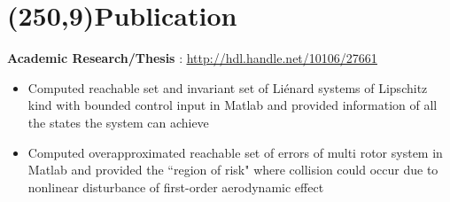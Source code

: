 \documentclass[10pt,a4paper]{extarticle}
\begin{document}
\section*{\colorbox{gray!10}{\makebox(250,9){\textcolor{blue!65}{Publication\hfill}}}}
\textbf{Academic Research/Thesis} : \href{http://hdl.handle.net/10106/27661}{\ul{http://hdl.handle.net/10106/27661}}
\vspace{-0.6em}
\begin{itemize}[leftmargin = 0.6cm]
\setlength\itemsep{-0.2em}
\item Computed reachable set and invariant set of Li\'enard systems of Lipschitz kind with bounded control input in Matlab and provided information of all the states the system can achieve
\item Computed overapproximated reachable set of errors of multi rotor system in Matlab and provided the ``region of risk" where collision could occur due to nonlinear disturbance of first-order aerodynamic effect
\end{itemize}





\iffalse
\vfill

\section*{\colorbox{gray!10}{\makebox(250,9){\textcolor{blue!65}{Extra Activities\hfill}}}}
\vspace{0em}
\begin{itemize}
\setlength\itemsep{-0.2em}
\item Participated in workshop on Image Processing and Robotics.
\item Participated in workshop on Catia V5.
\item Participated in workshop on RC Aeroplane modelling and control.
\end{itemize}

\vspace{-0.45cm}
\fi
\end{document}
